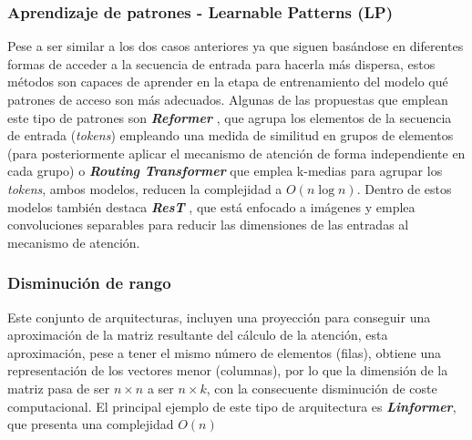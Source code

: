 \documentclass[a4paper, 11pt]{article}
\newcommand{\textbfit}[1]{\textbf{\textit{#1}}}
\begin{document}
\subsubsection{Aprendizaje de patrones - Learnable Patterns (LP)}
Pese a ser similar a los dos casos anteriores ya que siguen basándose en diferentes formas de acceder a la secuencia de entrada para hacerla más dispersa, estos métodos son capaces de aprender en la etapa de entrenamiento del modelo qué patrones de acceso son más adecuados. Algunas de las propuestas que emplean este tipo de patrones son \textbfit{Reformer} \cite{Kitaev2020Reformer:}, que agrupa los elementos de la secuencia de entrada (\textit{tokens}) empleando una medida de similitud en grupos de elementos (para posteriormente aplicar el mecanismo de atención de forma independiente en cada grupo) o \textbfit{Routing Transformer} \cite{routingtransformer} que emplea k-medias para agrupar los \textit{tokens}, ambos modelos, reducen la complejidad a $O(n \log n)$. Dentro de estos modelos también destaca \textbfit{ResT} \cite{zhql2021ResT}, que está enfocado a imágenes y emplea convoluciones separables para reducir las dimensiones de las entradas al mecanismo de atención.


\subsubsection{Disminución de rango}
Este conjunto de arquitecturas, incluyen una proyección para conseguir una aproximación de la matriz resultante del cálculo de la atención, esta aproximación, pese a tener el mismo número de elementos (filas), obtiene una representación de los vectores menor (columnas), por lo que la dimensión de la matriz pasa de ser $n \times n$ a ser $n \times k$, con la consecuente disminución de coste computacional. El principal ejemplo de este tipo de arquitectura es \textbfit{Linformer}, \cite{wang2020linformer} que presenta una complejidad $O(n)$
\end{document}
